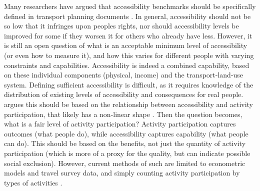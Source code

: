 Many researchers have argued that accessibility benchmarks should be specifically defined in transport planning documents \cite{manaugh_integrating_2015, allen_benchmarking_2019}. In general, accessibility should not be so low that it infringes upon peoples rights, nor should accessibility levels be improved for some if they worsen it for others who already have less. However, it is still an open question of what is an acceptable minimum level of accessibility  (or even how to measure it), and how this varies for different people with varying constraints and capabilities. Accessibility is indeed a combined capability, based on these individual components (physical, income) and the transport-land-use system. Defining sufficient accessibility is difficult, as it requires knowledge of the distribution of existing levels of accessibility and consequences for real people.  argues this should be based on the relationship between accessibility and activity participation, that likely has a non-linear shape \cite{allen_planning_2020}.  Then the question becomes, what is a fair level of activity participation? Activity participation captures outcomes (what people do), while accessibility captures capability (what people can do). This should be based on the benefits, not just the quantity of activity participation (which is more of a proxy for the quality, but can indicate possible social exclusion).  However, current methods of such are limited to econometric models and travel survey data, and simply counting activity participation by types of activities \cite{fransen_spatio-temporal_2018,allen_planning_2020}. 



